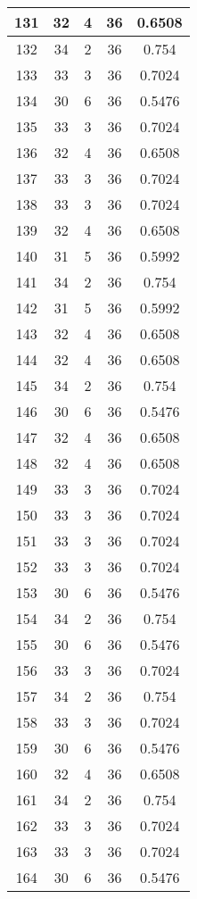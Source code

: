 \documentclass[letterpaper, 12pt]{article}
\begin{document}
\begin{longtable}{|c|c|c|c|c|}
\hline
131 & 32 & 4 & 36 & 0.6508 \\
\hline
132 & 34 & 2 & 36 & 0.754 \\
\hline
133 & 33 & 3 & 36 & 0.7024 \\
\hline
134 & 30 & 6 & 36 & 0.5476 \\
\hline
135 & 33 & 3 & 36 & 0.7024 \\
\hline
136 & 32 & 4 & 36 & 0.6508 \\
\hline
137 & 33 & 3 & 36 & 0.7024 \\
\hline
138 & 33 & 3 & 36 & 0.7024 \\
\hline
139 & 32 & 4 & 36 & 0.6508 \\
\hline
140 & 31 & 5 & 36 & 0.5992 \\
\hline
141 & 34 & 2 & 36 & 0.754 \\
\hline
142 & 31 & 5 & 36 & 0.5992 \\
\hline
143 & 32 & 4 & 36 & 0.6508 \\
\hline
144 & 32 & 4 & 36 & 0.6508 \\
\hline
145 & 34 & 2 & 36 & 0.754 \\
\hline
146 & 30 & 6 & 36 & 0.5476 \\
\hline
147 & 32 & 4 & 36 & 0.6508 \\
\hline
148 & 32 & 4 & 36 & 0.6508 \\
\hline
149 & 33 & 3 & 36 & 0.7024 \\
\hline
150 & 33 & 3 & 36 & 0.7024 \\
\hline
151 & 33 & 3 & 36 & 0.7024 \\
\hline
152 & 33 & 3 & 36 & 0.7024 \\
\hline
153 & 30 & 6 & 36 & 0.5476 \\
\hline
154 & 34 & 2 & 36 & 0.754 \\
\hline
155 & 30 & 6 & 36 & 0.5476 \\
\hline
156 & 33 & 3 & 36 & 0.7024 \\
\hline
157 & 34 & 2 & 36 & 0.754 \\
\hline
158 & 33 & 3 & 36 & 0.7024 \\
\hline
159 & 30 & 6 & 36 & 0.5476 \\
\hline
160 & 32 & 4 & 36 & 0.6508 \\
\hline
161 & 34 & 2 & 36 & 0.754 \\
\hline
162 & 33 & 3 & 36 & 0.7024 \\
\hline
163 & 33 & 3 & 36 & 0.7024 \\
\hline
164 & 30 & 6 & 36 & 0.5476 \\

\end{longtable}
\end{document}
